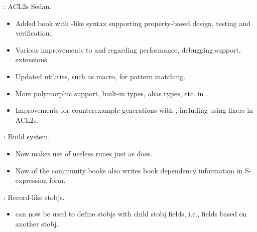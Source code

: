 
\begin{frame}

\implibtitle

: ACL2s Sedan.
\begin{itemize}
\item Added  book with -like syntax
  supporting property-based design, testing and verification.
\item Various improvements to  and 
  regarding performance, debugging support, extensions.
\item Updated utilities, such as  macro, for pattern matching.
\item More polymorphic support, built-in types, alias types, etc.
  in .
\item Improvements for counterexample generations with ,
  including using fixers in ACL2s.
\end{itemize}

\end{frame}


\begin{frame}

\implibtitle

:
Build system.
\begin{itemize}
\item Now  makes use of useless runes just as  does.
\item Now  of the community books also writes book dependency
      information in S-expression form.
\end{itemize}

\end{frame}


\begin{frame}

\implibtitle

:
Record-like stobjs.
\begin{itemize}
\item {} can now be used to define stobjs with child
      stobj fields, i.e., fields based on another stobj.
\end{itemize}

\end{frame}

